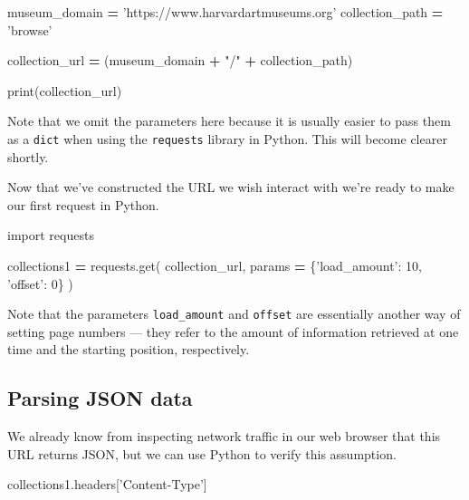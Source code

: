 \documentclass[
]{book}
\newenvironment{Shaded}{\begin{snugshade}}{\end{snugshade}}
\newcommand{\BuiltInTok}[1]{#1}
\newcommand{\DecValTok}[1]{\textcolor[rgb]{0.00,0.00,0.81}{#1}}
\newcommand{\ImportTok}[1]{#1}
\newcommand{\NormalTok}[1]{#1}
\newcommand{\OperatorTok}[1]{\textcolor[rgb]{0.81,0.36,0.00}{\textbf{#1}}}
\newcommand{\StringTok}[1]{\textcolor[rgb]{0.31,0.60,0.02}{#1}}
\begin{document}
\begin{Shaded}
\begin{Highlighting}[]
\NormalTok{museum_domain }\OperatorTok{=} \StringTok{'https://www.harvardartmuseums.org'}
\NormalTok{collection_path }\OperatorTok{=} \StringTok{'browse'}

\NormalTok{collection_url }\OperatorTok{=}\NormalTok{ (museum_domain}
                  \OperatorTok{+} \StringTok{"/"}
                  \OperatorTok{+}\NormalTok{ collection_path)}

\BuiltInTok{print}\NormalTok{(collection_url)}
\end{Highlighting}
\end{Shaded}

Note that we omit the parameters here because it is usually easier to
pass them as a \texttt{dict} when using the \texttt{requests} library in Python.
This will become clearer shortly.

Now that we've constructed the URL we wish interact with we're ready
to make our first request in Python.

\begin{Shaded}
\begin{Highlighting}[]
\ImportTok{import}\NormalTok{ requests}

\NormalTok{collections1 }\OperatorTok{=}\NormalTok{ requests.get(}
\NormalTok{    collection_url,}
\NormalTok{    params }\OperatorTok{=}\NormalTok{ \{}\StringTok{'load_amount'}\NormalTok{: }\DecValTok{10}\NormalTok{,}
                  \StringTok{'offset'}\NormalTok{: }\DecValTok{0}\NormalTok{\}}
\NormalTok{)}
\end{Highlighting}
\end{Shaded}

Note that the parameters \texttt{load\_amount} and \texttt{offset} are essentially
another way of setting page numbers --- they refer to the amount of
information retrieved at one time and the starting position, respectively.

\hypertarget{parsing-json-data}{%
\subsection{Parsing JSON data}\label{parsing-json-data}}

We already know from inspecting network traffic in our web
browser that this URL returns JSON, but we can use Python
to verify this assumption.

\begin{Shaded}
\begin{Highlighting}[]
\NormalTok{collections1.headers[}\StringTok{'Content-Type'}\NormalTok{]}
\end{Highlighting}
\end{Shaded}
\end{document}
